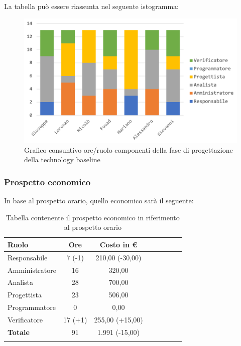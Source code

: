 			La tabella può essere riassunta nel seguente istogramma:
			
			\begin{figure}[H]
				\centering
				\includegraphics[width=0.8\linewidth]{images/consuntivo/ConsCorrez1.png}
				\caption{Grafico consuntivo ore/ruolo componenti della fase di progettazione della technology baseline}
				\label{fig:consuntivo grafico suddivione ruoli fase di progettazione della technology baseline}
			\end{figure}
		\pagebreak
			
		\subsubsection{Prospetto economico}
			In base al prospetto orario, quello economico sarà il seguente: 
			
			\begin{longtable}{|l|c|c|c|c|c|c|c}
				\hline
				\rowcolor{lighter-grayer}
				\textbf{Ruolo} & \textbf{Ore} & \textbf{Costo in €} \\
				\hline
				\endfirsthead
				\hline
				Responsabile 	    & 7 (-1) & 210,00 (-30,00)\\
				\hline 
				\hline
				Amministratore	  & 16 & 320,00\\
				\hline
				\hline
				Analista 				& 28 & 700,00\\
				\hline
				\hline
				Progettista 		  & 23 & 506,00\\
				\hline
				\hline
				Programmatore 	 & 0 & 0,00\\
				\hline
				\hline
				Verificatore 		  & 17 (+1) & 255,00 (+15,00)\\
				\hline
				\textbf{Totale} 	& 91 & 1.991 (-15,00)\\
				\hline
				
				\caption{Tabella contenente il prospetto economico in riferimento al prospetto orario}
			\end{longtable}
			
